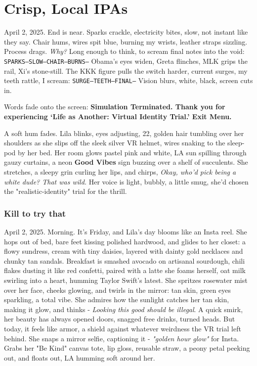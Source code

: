 \documentclass[12pt,oneside]{book}
\newcommand{\note}[1]{\texttt{#1}}
\begin{document}
\chapter{Crisp, Local IPAs}

April 2, 2025. End is near. Sparks crackle, electricity bites, slow, not instant like they say. Chair hums, wires spit blue, burning my wrists, leather straps sizzling. Process drags. \textit{Why?} Long enough to think, to scream final notes into the void: \note{SPARKS—SLOW—CHAIR—BURNS—} Obama’s eyes widen, Greta flinches, MLK grips the rail, Xi’s stone-still. The KKK figure pulls the switch harder, current surges, my teeth rattle, I scream: \note{SURGE—TEETH—FINAL—} Vision blurs, white, black, screen cuts in.

Words fade onto the screen: \textbf{Simulation Terminated. Thank you for experiencing ‘Life as Another: Virtual Identity Trial.’ Exit Menu.}

A soft hum fades. Lila blinks, eyes adjusting, 22, golden hair tumbling over her shoulders as she slips off the sleek silver VR helmet, wires snaking to the sleep-pod by her bed. Her room glows pastel pink and white, LA sun spilling through gauzy curtains, a neon \textbf{Good Vibes} sign buzzing over a shelf of succulents. She stretches, a sleepy grin curling her lips, and chirps, \textit{Okay, who’d pick being a white dude? That was wild.} Her voice is light, bubbly, a little smug, she’d chosen the "realistic-identity" trial for the thrill.

\subsection*{Kill to try that}

April 2, 2025. Morning. It’s Friday, and Lila’s day blooms like an Insta reel. She hops out of bed, bare feet kissing polished hardwood, and glides to her closet: a flowy sundress, cream with tiny daisies, layered with dainty gold necklaces and chunky tan sandals. Breakfast is smashed avocado on artisanal sourdough, chili flakes dusting it like red confetti, paired with a latte she foams herself, oat milk swirling into a heart, humming Taylor Swift’s latest. She spritzes rosewater mist over her face, cheeks glowing, and twirls in the mirror: tan skin, green eyes sparkling, a total vibe. She admires how the sunlight catches her tan skin, making it glow, and thinks - \textit{Looking this good should be illegal}. A quick smirk, her beauty has always opened doors, snagged free drinks, turned heads. But today, it feels like armor, a shield against whatever weirdness the VR trial left behind. She snaps a mirror selfie, captioning it - \textit{"golden hour glow"} for Insta. Grabs her "Be Kind" canvas tote, lip gloss, reusable straw, a peony petal peeking out, and floats out, LA humming soft around her.
\end{document}
